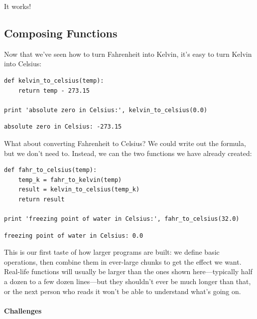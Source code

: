 \documentclass{book}
\begin{document}
It works!

\subsection{Composing Functions}

Now that we've seen how to turn Fahrenheit into Kelvin, it's easy to
turn Kelvin into Celsius:

\begin{verbatim}
def kelvin_to_celsius(temp):
    return temp - 273.15

print 'absolute zero in Celsius:', kelvin_to_celsius(0.0)
\end{verbatim}

\begin{verbatim}
absolute zero in Celsius: -273.15
\end{verbatim}

What about converting Fahrenheit to Celsius? We could write out the
formula, but we don't need to. Instead, we can
 the two functions we have
already created:

\begin{verbatim}
def fahr_to_celsius(temp):
    temp_k = fahr_to_kelvin(temp)
    result = kelvin_to_celsius(temp_k)
    return result

print 'freezing point of water in Celsius:', fahr_to_celsius(32.0)
\end{verbatim}

\begin{verbatim}
freezing point of water in Celsius: 0.0
\end{verbatim}

This is our first taste of how larger programs are built: we define
basic operations, then combine them in ever-large chunks to get the
effect we want. Real-life functions will usually be larger than the ones
shown here---typically half a dozen to a few dozen lines---but they
shouldn't ever be much longer than that, or the next person who reads it
won't be able to understand what's going on.

\mbox{}\paragraph{Challenges}
\end{document}
